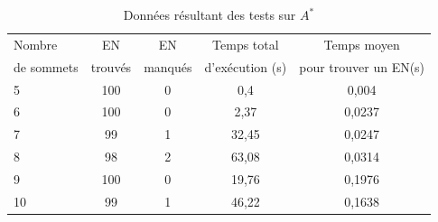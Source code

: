 \begin{table}[!ht]
\centering
\caption{Données résultant des tests sur $A^*$}
\label{tab:premierTest}
\begin{tabular}{|l||c|c|c|c|}
	
\hline 
Nombre  & EN & EN & Temps total & Temps moyen  \\ 
de sommets & trouvés & manqués & d'exécution (s) & pour trouver un EN(s) \\ 

\hline 
\hline
5                                                                                 & 100                                                   & 0                                                     & 0,4                                                                    & 0,004                                                                          \\ \cline{1-5}
6                                                                                 & 100                                                   & 0                                                     & 2,37                                                                   & 0,0237                                                                         \\ \cline{1-5}
7                                                                                 & 99                                                    & 1                                                     & 32,45                                                                  & 0,0247                                                                        \\ \cline{1-5}
8                                                                                 & 98                                                    & 2                                                     & 63,08                                                                  & 0,0314                                                                         \\ \cline{1-5}
9                                                                                 & 100                                                   & 0                                                     & 19,76                                                                  & 0,1976                                                                        \\ \cline{1-5}
10                                                                                & 99                                                    & 1                                                     & 46,22                                                                  & 0,1638                                                                        \\ \cline{1-5}

\end{tabular}
\end{table}
